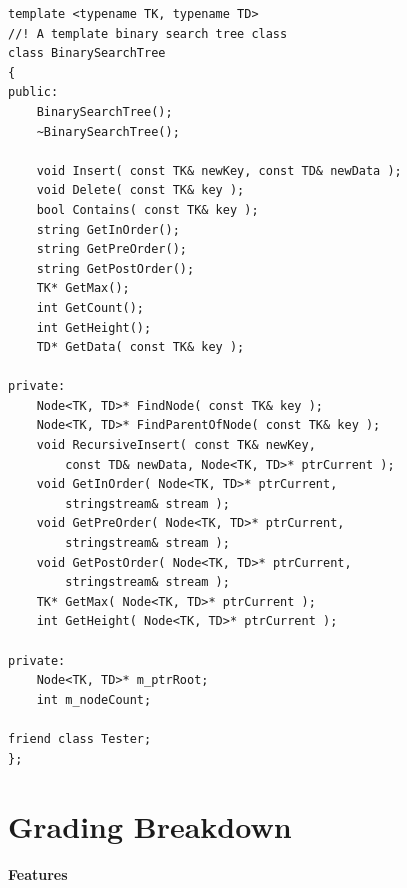 \documentclass[a4paper,12pt,oneside]{book}
\begin{document}
    \begin{lstlisting}[style=code]
template <typename TK, typename TD>
//! A template binary search tree class
class BinarySearchTree
{
public:
    BinarySearchTree();
    ~BinarySearchTree();
    
    void Insert( const TK& newKey, const TD& newData );
    void Delete( const TK& key );
    bool Contains( const TK& key );
    string GetInOrder();
    string GetPreOrder();
    string GetPostOrder();
    TK* GetMax();
    int GetCount();
    int GetHeight();
    TD* GetData( const TK& key );

private:
    Node<TK, TD>* FindNode( const TK& key );
    Node<TK, TD>* FindParentOfNode( const TK& key );
    void RecursiveInsert( const TK& newKey,
        const TD& newData, Node<TK, TD>* ptrCurrent );
    void GetInOrder( Node<TK, TD>* ptrCurrent,
        stringstream& stream );
    void GetPreOrder( Node<TK, TD>* ptrCurrent,
        stringstream& stream );
    void GetPostOrder( Node<TK, TD>* ptrCurrent,
        stringstream& stream );
    TK* GetMax( Node<TK, TD>* ptrCurrent );
    int GetHeight( Node<TK, TD>* ptrCurrent );

private:
    Node<TK, TD>* m_ptrRoot;
    int m_nodeCount;

friend class Tester;
};
    \end{lstlisting}
    
    \chapter*{Grading Breakdown}

    \textbf{Features}
\end{document}
